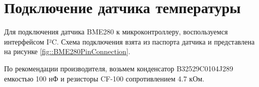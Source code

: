 \section {Подключение датчика температуры}

Для подключения датчика BME280 к микроконтроллеру, воспользуемся интерфейсом I²C. Схема подключения взята из паспорта датчика \cite{} и представлена на рисунке \ref{fig::BME280PinConnection}.


По рекомендации производителя, возьмем конденсатор B32529C0104J289 емкостью 100 нФ и резисторы CF-100 сопротивлением 4.7 кОм.
